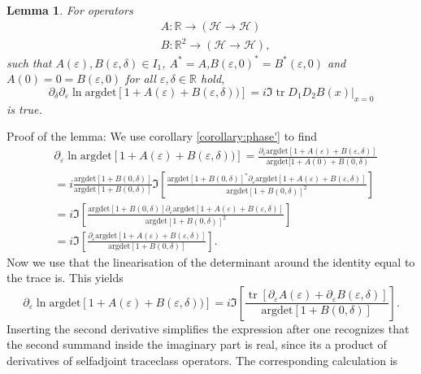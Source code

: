 \documentclass[oneside,reqno,12pt]{amsart}
\newtheorem{lemma}{Lemma}
\DeclareMathOperator{\tr}{tr}
\begin{document}
\begin{lemma}
For operators 
\begin{align*}
&A: \mathbb{R}\rightarrow \left( \mathcal{H}\rightarrow\mathcal{H}\right)\\
&B: \mathbb{R}^2 \rightarrow \left( \mathcal{H}\rightarrow\mathcal{H}\right),
\end{align*}
such that \(A(\varepsilon),B(\varepsilon,\delta)\in I_1\), \(A^*=A\),\(B(\varepsilon,0)^*=B^*(\varepsilon,0)\) and \(A(0)=0=B(\varepsilon,0)\) for all \(\varepsilon,\delta\in\mathbb{R}\) hold, 
\begin{equation}
\partial_\delta \partial_\varepsilon \ln \text{argdet}\left[ 1 + A(\varepsilon) + B(\varepsilon,\delta))\right] 
= i \Im \tr D_1 D_2 B(x)|_{x=0}
\end{equation}
is true.
\end{lemma}
Proof of the lemma: We use corollary \ref{corollary:phase'} to find
\begin{align*}
&\partial_\varepsilon \ln \text{argdet}\left[ 1 + A(\varepsilon) + B(\varepsilon,\delta))\right] 
= \frac{\partial_\varepsilon \text{argdet}[1+A(\varepsilon) + B(\varepsilon,\delta)]}{\text{argdet}[1+A(0)+B(0,\delta)}\\
&=i \frac{\text{argdet}[1+B(0,\delta)]}{\text{argdet}[1+B(0,\delta)]} \Im \left[ \frac{\text{argdet}[1+B(0,\delta)]^* \partial_\varepsilon \text{argdet}[1+A(\varepsilon)+B(\varepsilon,\delta)]}{\text{argdet}[1+B(0,\delta)]^2}\right]\\
&=i \Im \left[ \frac{\text{argdet}[1+B(0,\delta)] \partial_\varepsilon \text{argdet}[1+A(\varepsilon)+B(\varepsilon,\delta)]}{\text{argdet}[1+B(0,\delta)]^2}\right]\\
&=i \Im \left[ \frac{\partial_\varepsilon \text{argdet}[1+A(\varepsilon)+B(\varepsilon,\delta)]}{\text{argdet}[1+B(0,\delta)]}\right].
\end{align*}
Now we use that the linearisation of the determinant around the identity equal to the trace is. This yields
\begin{equation}
\partial_\varepsilon \ln \text{argdet}\left[ 1 + A(\varepsilon) + B(\varepsilon,\delta))\right] 
=i \Im \left[ \frac{ \tr [\partial_\varepsilon A(\varepsilon)+\partial_\varepsilon B(\varepsilon,\delta)]}{\text{argdet}[1+B(0,\delta)]}\right].
\end{equation}
Inserting the second derivative simplifies the expression after one recognizes that the second summand inside the imaginary part is real, since its a product of derivatives of selfadjoint traceclass operators. The corresponding calculation is
\end{document}
